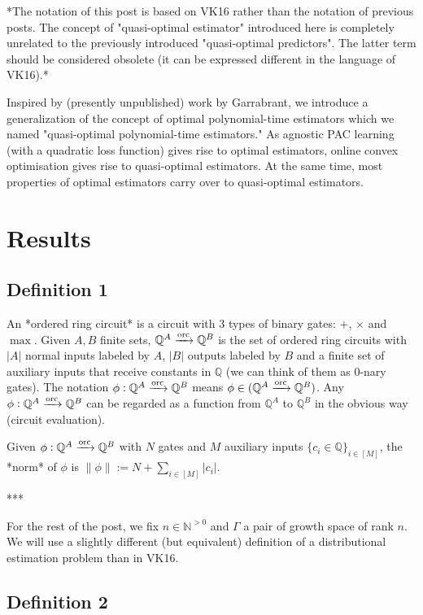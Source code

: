 \documentclass[a4paper]{article}
\newcommand{\Nats}{\mathbb{N}}
\newcommand{\Rats}{\mathbb{Q}}
\newcommand{\Abs}[1]{\lvert #1 \rvert}
\newcommand{\Norm}[1]{\lVert #1 \rVert}
\newcommand{\ORC}{\xrightarrow{\textnormal{orc}}}
\begin{document}
*The notation of this post is based on VK16 rather than the notation of previous posts. The concept of "quasi-optimal estimator" introduced here is completely unrelated to the previously introduced "quasi-optimal predictors". The latter term should be considered obsolete (it can be expressed different in the language of VK16).*

Inspired by (presently unpublished) work by Garrabrant, we introduce a generalization of the concept of optimal polynomial-time estimators which we named "quasi-optimal polynomial-time estimators." As agnostic PAC learning (with a quadratic loss function) gives rise to optimal estimators, online convex optimisation gives rise to quasi-optimal estimators. At the same time, most properties of optimal estimators carry over to quasi-optimal estimators.

\section{Results}

\subsection{Definition 1}

An *ordered ring circuit* is a circuit with 3 types of binary gates: ${+}$, ${\times}$ and ${\max}$. Given ${A,B}$ finite sets, ${\Rats^A \ORC \Rats^B}$ is the set of ordered ring circuits with $\Abs{A}$ normal inputs labeled by ${A}$, ${\Abs{B}}$ outputs labeled by ${B}$ and a finite set of auxiliary inputs that receive constants in ${\Rats}$ (we can think of them as 0-nary gates). The notation ${\phi: \Rats^A \ORC \Rats^B}$ means ${\phi \in (\Rats^A \ORC \Rats^B)}$. Any ${\phi: \Rats^A \ORC \Rats^B}$ can be regarded as a function from ${\Rats^A}$ to ${\Rats^B}$ in the obvious way (circuit evaluation). 

Given ${\phi: \Rats^A \ORC \Rats^B}$ with ${N}$ gates and ${M}$ auxiliary inputs ${\{c_i \in \Rats\}_{i \in [M]}}$, the *norm* of ${\phi}$ is ${\Norm{\phi}:=N+\sum_{i \in [M]} \Abs{c_i}}$.

***

For the rest of the post, we fix ${n \in \Nats^{>0}}$ and ${\Gamma}$ a pair of growth space of rank ${n}$. We will use a slightly different (but equivalent) definition of a distributional estimation problem than in VK16.

\subsection{Definition 2}
\end{document}
